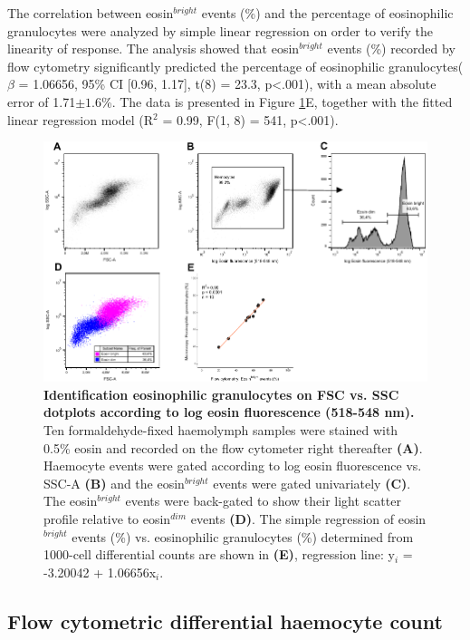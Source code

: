 The correlation between eosin$^{bright}$ events (\%) and the percentage of eosinophilic granulocytes were analyzed by simple linear regression on order to verify the linearity of response. The analysis showed that eosin$^{bright}$ events (\%) recorded by flow cytometry significantly predicted the percentage of eosinophilic granulocytes($\beta$ = 1.06656, 95\% CI [0.96, 1.17], t(8) = 23.3, p<.001), with a mean absolute error of 1.71$\pm{1.6}$\%. The data is presented in Figure \ref{fig:eosin_exp2}E, together with the fitted linear regression model (R$^{2}$ = 0.99, F(1, 8) = 541, p<.001).

\begin{figure}[H]
    \centering
    \includegraphics[width=1.0\textwidth]{figures/Method development/Eosin with method validation.pdf}
    \caption{\textbf{Identification eosinophilic granulocytes on FSC vs. SSC dotplots according to log eosin fluorescence (518-548 nm).} Ten formaldehyde-fixed haemolymph samples were stained with 0.5\% eosin and recorded on the flow cytometer right thereafter \textbf{(A)}. Haemocyte events were gated according to log eosin fluorescence vs. SSC-A \textbf{(B)} and the eosin$^{bright}$ events were gated univariately \textbf{(C)}. The eosin$^{bright}$ events were back-gated to show their light scatter profile relative to eosin$^{dim}$ events \textbf{(D)}. The simple regression of eosin$^{bright}$ events (\%) vs. eosinophilic granulocytes (\%) determined from 1000-cell differential counts are shown in \textbf{(E)}, regression line: y$_{i}$ = -3.20042 + 1.06656x$_{i}$.}
    \label{fig:eosin_exp2}
\end{figure}

\subsection{Flow cytometric differential haemocyte count}


